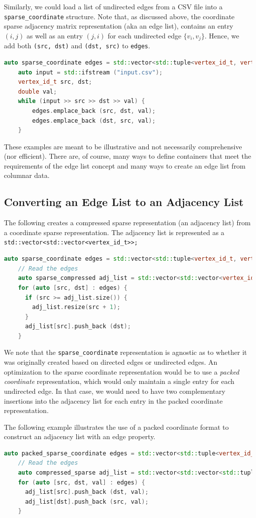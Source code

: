 Similarly, we could load a list of undirected edges from a CSV file into a 
\lstinline{sparse_coordinate} structure.  
Note that, as discussed above, the coordinate sparse adjacency matrix representation (aka an edge list), contains an entry $(i, j)$ as well as an entry $(j, i)$ for each undirected edge $\{ v_i, v_j \}$.  Hence, we add both \lstinline{(src, dst)} and  \lstinline{(dst, src)} to \lstinline{edges}.
\begin{lstlisting}[language=C++]
    auto sparse_coordinate edges = std::vector<std::tuple<vertex_id_t, vertex_id_t, double> edges;
    auto input = std::ifstream ("input.csv");
    vertex_id_t src, dst;
    double val;
    while (input >> src >> dst >> val) {
        edges.emplace_back (src, dst, val);
        edges.emplace_back (dst, src, val);
    }
\end{lstlisting}

These examples are meant to be illustrative and not necessarily
comprehensive (nor efficient).
There are, of course, many ways to define containers that meet the
requirements of the edge list concept and many ways to
create an edge list from columnar data.

\subsection{Converting an Edge List to an Adjacency List}

The following creates a compressed sparse representation (an adjacency list) from a coordinate sparse representation.  The adjacency list is represented as 
a \lstinline{std::vector<std::vector<vertex_id_t>>;}
\begin{lstlisting}[language=C++]
    auto sparse_coordinate edges = std::vector<std::tuple<vertex_id_t, vertex_id_t>;
    // Read the edges
    auto sparse_compressed adj_list = std::vector<std::vector<vertex_id_t>>;
    for (auto [src, dst] : edges) {
      if (src >= adj_list.size()) {
        adj_list.resize(src + 1);
      }
      adj_list[src].push_back (dst);
    }
\end{lstlisting}

We note that the \lstinline{sparse_coordinate} representation is agnostic as to whether it was originally created based on directed edges or undirected edges.  An optimization to the sparse coordinate representation would be to use a \emph{packed coordinate} representation, which would only maintain a single entry for each undirected edge.  In that case, we would need to have two complementary insertions into the adjacency list for each entry in the packed coordinate representation.

The following example illustrates the use of a packed coordinate format to construct an adjacency list with an edge property.
\begin{lstlisting}[language=C++]
    auto packed_sparse_coordinate edges = std::vector<std::tuple<vertex_id_t, vertex_id_t, double>>;
    // Read the edges
    auto compressed_sparse adj_list = std::vector<std::vector<std::tuple<vertex_id_t, double>>>(edges.num_vertices();
    for (auto [src, dst, val] : edges) {
      adj_list[src].push_back (dst, val);
      adj_list[dst].push_back (src, val);
    }
 \end{lstlisting}
